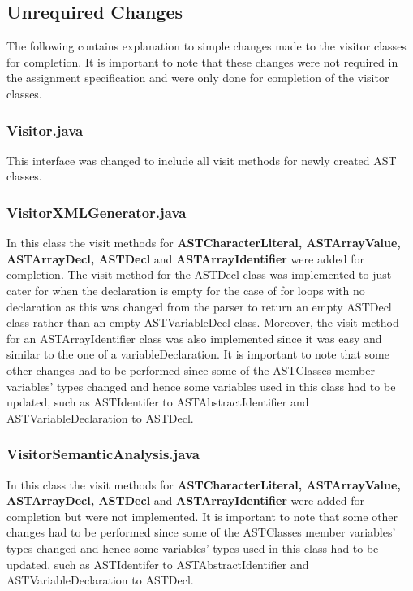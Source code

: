 \documentclass{article}
\begin{document}
				
				\subsection{Unrequired Changes}
				
				The following contains explanation to simple changes made to the visitor classes for completion. It is important to note that these changes were not required in the assignment specification and were only done for completion of the visitor classes.
				
				\subsubsection{Visitor.java}
				
				This interface was changed to include all visit methods for newly created AST classes.
				
				\subsubsection{VisitorXMLGenerator.java}
				
				In this class the visit methods for \textbf{ASTCharacterLiteral, ASTArrayValue, ASTArrayDecl, ASTDecl} and \textbf{ASTArrayIdentifier} were added for completion. The visit method for the ASTDecl class was implemented to just cater for when the declaration is empty for the case of for loops with no declaration as this was changed from the parser to return an empty ASTDecl class rather than an empty ASTVariableDecl class. Moreover, the visit method for an ASTArrayIdentifier class was also implemented since it was easy and similar to the one of a variableDeclaration. It is important to note that some other changes had to be performed since some of the ASTClasses member variables' types changed and hence some variables used in this class had to be updated, such as ASTIdentifer to ASTAbstractIdentifier and ASTVariableDeclaration to ASTDecl.
				
				\subsubsection{VisitorSemanticAnalysis.java}
				
				In this class the visit methods for \textbf{ASTCharacterLiteral, ASTArrayValue, ASTArrayDecl, ASTDecl} and \textbf{ASTArrayIdentifier} were added for completion but were not implemented. It is important to note that some other changes had to be performed since some of the ASTClasses member variables' types changed and hence some variables' types used in this class had to be updated, such as ASTIdentifer to ASTAbstractIdentifier and ASTVariableDeclaration to ASTDecl.
				
\end{document}
